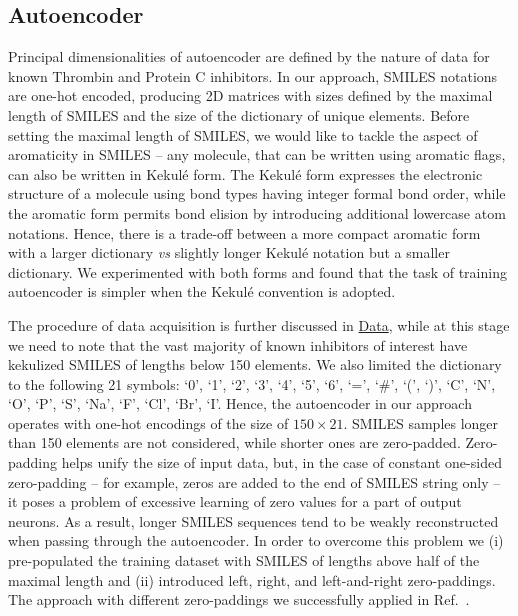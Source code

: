 \documentclass[12pt]{article}
\begin{document}
\subsection*{\sffamily \large Autoencoder}

Principal dimensionalities of autoencoder are defined by the nature of data for known Thrombin and Protein C inhibitors.
In our approach, SMILES notations are one-hot encoded, producing 2D matrices with sizes defined by the maximal length of SMILES and the size of the dictionary of unique elements.
Before setting the maximal length of SMILES, we would like to tackle the aspect of aromaticity in SMILES -- any molecule, that can be written using aromatic flags, can also be written in Kekul\'e form.
The Kekul\'e form expresses the electronic structure of a molecule using bond types having integer formal bond order, while the aromatic form permits bond elision by introducing additional lowercase atom notations.
Hence, there is a trade-off between a more compact aromatic form with a larger dictionary \textit{vs} slightly longer Kekul\'e notation but a smaller dictionary.
We experimented with both forms and found that the task of training autoencoder is simpler when the Kekul\'e convention is adopted.

The procedure of data acquisition is further discussed in \hyperref[sec:Data]{Data}, while at this stage we need to note that the vast majority of known inhibitors of interest have kekulized SMILES of lengths below 150 elements.
We also limited the dictionary to the following 21 symbols: %
%
`0', `1', `2', `3', `4', `5', `6',
`=', `\#', `(', `)',
`C', `N', `O', `P', `S',
`Na', `F', `Cl', `Br', `I'.
%
Hence, the autoencoder in our approach operates with one-hot encodings of the size of $150\times21$.
SMILES samples longer than 150 elements are not considered, while shorter ones are zero-padded.
Zero-padding helps unify the size of input data, but, in the case of constant one-sided zero-padding -- for example, zeros are added to the end of SMILES string only -- it poses a problem of excessive learning of zero values for a part of output neurons.
As a result, longer SMILES sequences tend to be weakly reconstructed when passing through the autoencoder.
In order to overcome this problem we (i) pre-populated the training dataset with SMILES of lengths above half of the maximal length and (ii) introduced left, right, and left-and-right zero-paddings.
The approach with different zero-paddings we successfully applied in Ref.~.
\end{document}
